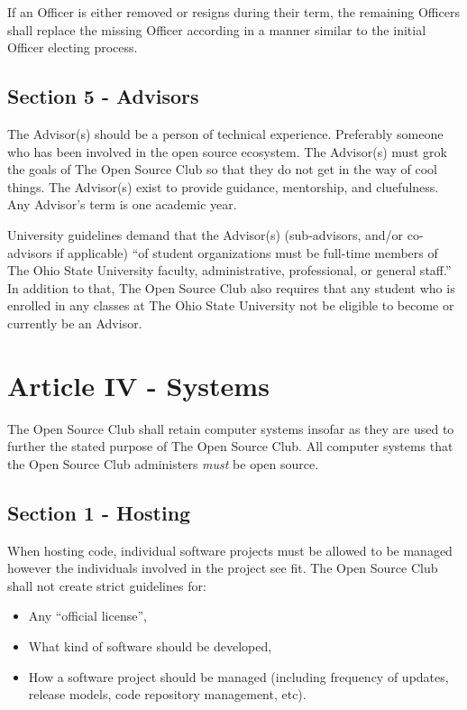 \documentclass{article}
\begin{document}
	If an Officer is either removed or resigns during their term, the remaining Officers shall replace the missing Officer according in a manner similar to the initial Officer electing process.

	\subsection{Section 5 - Advisors}

	The Advisor(s) should be a person of technical experience. Preferably someone who has been involved in the open source ecosystem. The Advisor(s) must grok the goals of The Open Source Club so that they do not get in the way of cool things. The Advisor(s) exist to provide guidance, mentorship, and cluefulness. Any Advisor's term is one academic year.

	University guidelines demand that the Advisor(s) (sub-advisors, and/or co-advisors if applicable) ``of student organizations must be full-time members of The Ohio State University faculty, administrative, professional, or general staff.'' In addition to that, The Open Source Club also requires that any student who is enrolled in any classes at The Ohio State University not be eligible to become or currently be an Advisor.

	\section{Article IV - Systems}

  The Open Source Club shall retain computer systems insofar as they are used to further the stated purpose of The Open Source Club. All computer systems that the Open Source Club administers \textit{must} be open source.

  \subsection{Section 1 - Hosting}

  When hosting code, individual software projects must be allowed to be managed however the individuals involved in the project see fit. The Open Source Club shall not create strict guidelines for:

  \begin{itemize}
    \item Any ``official license'',
    \item What kind of software should be developed,
    \item How a software project should be managed (including frequency of updates, release models, code repository management, etc).
  \end{itemize}
\end{document}
